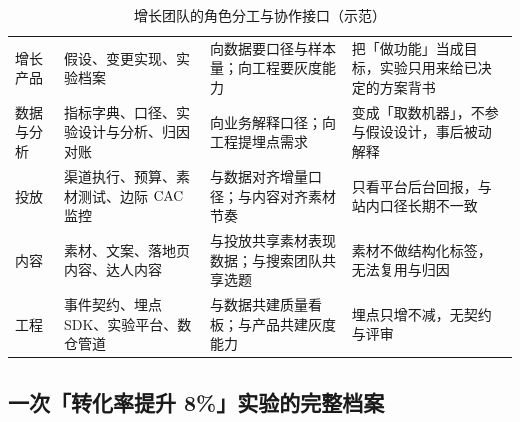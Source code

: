 \begin{table}[htbp]
\centering
\caption{增长团队的角色分工与协作接口（示范）}
\label{tab:growth-team}
\small
\begin{tabularx}{\textwidth}{L{2.3cm} L{3.4cm} L{3.0cm} Y}
\toprule
{} &  &  &  \\
\midrule
增长产品 & 假设、变更实现、实验档案 & 向数据要口径与样本量；向工程要灰度能力 & 把「做功能」当成目标，实验只用来给已决定的方案背书 \\
\addlinespace
数据与分析 & 指标字典、口径、实验设计与分析、归因对账 & 向业务解释口径；向工程提埋点需求 & 变成「取数机器」，不参与假设设计，事后被动解释 \\
\addlinespace
投放 & 渠道执行、预算、素材测试、边际 $\operatorname{CAC}$ 监控 & 与数据对齐增量口径；与内容对齐素材节奏 & 只看平台后台回报，与站内口径长期不一致 \\
\addlinespace
内容 & 素材、文案、落地页内容、达人内容 & 与投放共享素材表现数据；与搜索团队共享选题 & 素材不做结构化标签，无法复用与归因 \\
\addlinespace
工程 & 事件契约、埋点 SDK、实验平台、数仓管道 & 与数据共建质量看板；与产品共建灰度能力 & 埋点只增不减，无契约与评审 \\
\bottomrule
\end{tabularx}
\end{table}

\subsection{一次「转化率提升 8\%」实验的完整档案}

